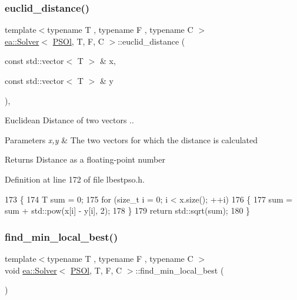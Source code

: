 \subsubsection{\texorpdfstring{euclid\+\_\+distance()}{euclid\_distance()}}
{\footnotesize\ttfamily template$<$typename T , typename F , typename C $>$ \\
\hyperlink{classea_1_1_solver}{ea\+::\+Solver}$<$ \hyperlink{structea_1_1_p_s_ol}{P\+S\+Ol}, T, F, C $>$\+::euclid\+\_\+distance (\begin{DoxyParamCaption}\item[{const std\+::vector$<$ T $>$ \&}]{x,  }\item[{const std\+::vector$<$ T $>$ \&}]{y }\end{DoxyParamCaption})\hspace{0.3cm}{\ttfamily [inline]}, {\ttfamily [private]}}



Euclidean Distance of two vectors .. 


\begin{DoxyParams}{Parameters}
{\em x,y} & The two vectors for which the distance is calculated \\
\hline
\end{DoxyParams}
\begin{DoxyReturn}{Returns}
Distance as a floating-\/point number 
\end{DoxyReturn}


Definition at line 172 of file lbestpso.\+h.


\begin{DoxyCode}
173         \{
174             T sum = 0;
175             \textcolor{keywordflow}{for} (\textcolor{keywordtype}{size\_t} i = 0; i < x.size(); ++i)
176             \{
177                 sum = sum + std::pow(x[i] - y[i], 2);
178             \}
179             \textcolor{keywordflow}{return} std::sqrt(sum);
180         \}
\end{DoxyCode}
\mbox{\label{classea_1_1_solver_3_01_p_s_ol_00_01_t_00_01_f_00_01_c_01_4_ae7821ee945e33732ec24d47c88d4b310}} 
\subsubsection{\texorpdfstring{find\+\_\+min\+\_\+local\+\_\+best()}{find\_min\_local\_best()}}
{\footnotesize\ttfamily template$<$typename T , typename F , typename C $>$ \\
void \hyperlink{classea_1_1_solver}{ea\+::\+Solver}$<$ \hyperlink{structea_1_1_p_s_ol}{P\+S\+Ol}, T, F, C $>$\+::find\+\_\+min\+\_\+local\+\_\+best (\begin{DoxyParamCaption}{ }\end{DoxyParamCaption})\hspace{0.3cm}{\ttfamily [private]}}



